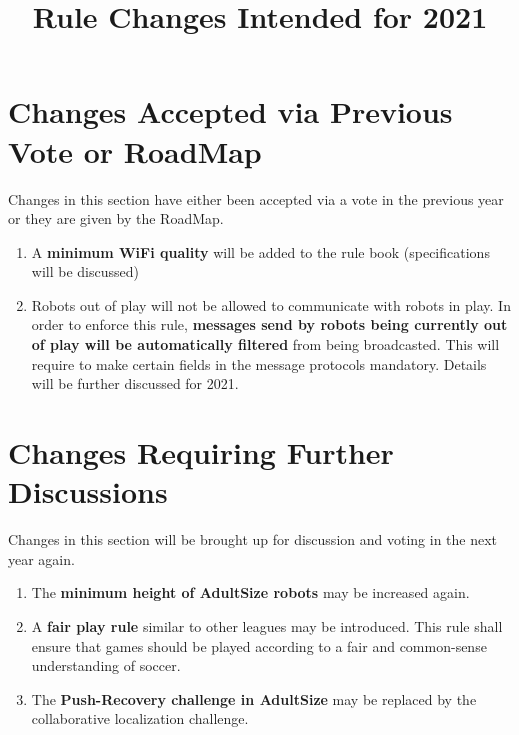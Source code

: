 \documentclass{article}
\title{Rule Changes Intended for 2021}
\date{\vspace{-12ex}}
\begin{document}
\maketitle

\begin{center}

\end{center}

\section{Changes Accepted via Previous Vote or RoadMap }
Changes in this section have either been accepted via a vote in the previous year or they are given by the RoadMap.

\begin{enumerate}
    \item A \textbf{minimum WiFi quality} will be added to the rule book (specifications will be discussed)
    \item Robots out of play will not be allowed to communicate with robots in play. In order to enforce this rule, \textbf{messages send by robots being currently out of play will be automatically filtered} from being broadcasted. This will require to make certain fields in the message protocols mandatory. Details will be further discussed for 2021.
\end{enumerate}

\section{Changes Requiring Further Discussions}
Changes in this section will be brought up for discussion and voting in the next year again.

\begin{enumerate}
    \item The \textbf{minimum height of AdultSize robots} may be increased again.
    \item A \textbf{fair play rule} similar to other leagues may be introduced. This rule shall ensure that games should be played according to a fair and common-sense understanding of soccer.
    \item The \textbf{Push-Recovery challenge in AdultSize} may be replaced by the collaborative localization challenge.
\end{enumerate}{}
\end{document}
